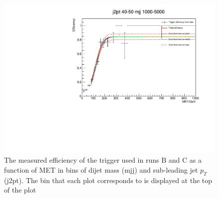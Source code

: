 \begin{figure}[h!]
\begin{center}
    \includegraphics[width=.6\largefigwidth]{plots/parked/trigfitplots/hData_MET_1D_25BC.pdf}
    \caption{The measured efficiency of the trigger used in runs B and C as a function of MET in bins of dijet mass (mjj) and sub-leading jet $p_{T}$ (j2pt). The bin that each plot corresponds to is displayed at the top of the plot}
    \label{fig:trigfitplotsBC1}
  \end{center}
\end{figure}

